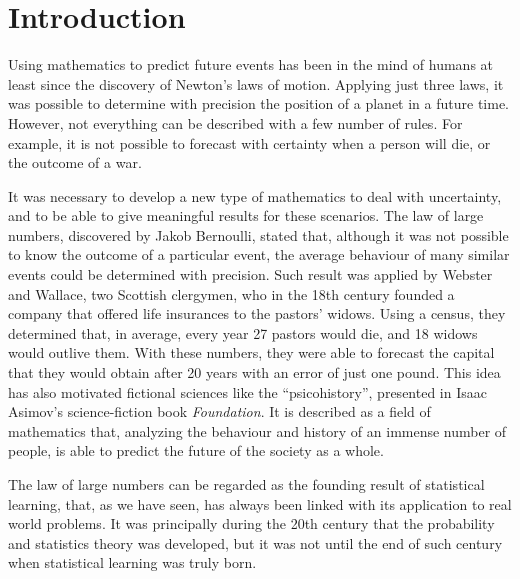 
\chapter{Introduction} %
\label{Chapter1}



Using mathematics to predict future events has been in the mind of humans at least since the discovery of Newton's laws of motion. Applying just three laws, it was possible to determine with precision the position of a planet in a future time. However, not everything can be described with a few number of rules. For example, it is not possible to forecast with certainty when a person will die, or the outcome of a war.

It was necessary to develop a new type of mathematics to deal with uncertainty, and to be able to give meaningful results for these scenarios. The law of large numbers, discovered by Jakob Bernoulli, stated that, although it was not possible to know the outcome of a particular event, the average behaviour of many similar events could be determined with precision. 
%
Such result was applied by Webster and Wallace, two Scottish clergymen, who in the 18th century founded a company that offered life insurances to the pastors' widows. Using a census, they determined that, in average, every year 27 pastors would die, and 18 widows would outlive them. With these numbers, they were able to forecast the capital that they would obtain after 20 years with an error of just one pound.
%
This idea has also motivated fictional sciences like the ``psicohistory'', presented in Isaac Asimov's science-fiction book \emph{Foundation}. It is described as a field of mathematics that, analyzing the behaviour and history of an immense number of people, is able to predict the future of the society as a whole. 

The law of large numbers can be regarded as the founding result of statistical learning, that, as we have seen, has always been linked with its application to real world problems. It was principally during the 20th century that the probability and statistics theory was developed, but it was not until the end of such century when statistical learning was truly born.

